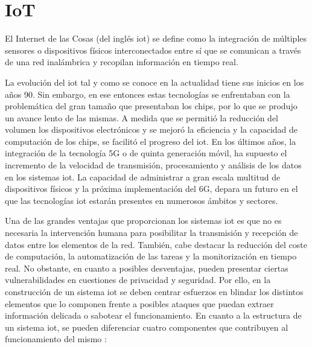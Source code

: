 \section{IoT}
\label{sec:iot}

El Internet de las Cosas (del inglés \gls{iot}) \cite{iot} \cite{iotamazon} se define como la integración de múltiples sensores o dispositivos físicos interconectados entre sí que se comunican a través de una red inalámbrica y recopilan información en tiempo real. 

\vspace{3mm}

La evolución del \gls{iot} tal y como se conoce en la actualidad tiene sus inicios en los años 90. Sin embargo, en ese entonces estas tecnologías se enfrentaban con la problemática del gran tamaño que presentaban los chips, por lo que se produjo un avance lento de las mismas. A medida que se permitió la reducción del volumen los dispositivos electrónicos y se mejoró la eficiencia y la capacidad de computación de los chips, se facilitó el progreso del \gls{iot}. En los últimos años, la integración de la tecnología 5G o de quinta generación móvil, ha supuesto el incremento de la velocidad de transmisión, procesamiento y análisis de los datos en los sistemas \gls{iot}. La capacidad de administrar a gran escala multitud de dispositivos físicos y la próxima implementación del 6G, depara un futuro en el que las tecnologías \gls{iot} estarán presentes en numerosos ámbitos y sectores.

\vspace{3mm}

Una de las grandes ventajas que proporcionan los sistemas \gls{iot} es que no es necesaria la intervención humana para posibilitar la transmisión y recepción de datos entre los elementos de la red. También, cabe destacar la reducción del coste de computación, la automatización de las tareas y la monitorización en tiempo real. No obstante, en cuanto a posibles desventajas, pueden presentar ciertas vulnerabilidades en cuestiones de privacidad y seguridad. Por ello, en la construcción de un sistema \gls{iot} se deben centrar esfuerzos en blindar los distintos elementos que lo componen frente a posibles ataques que puedan extraer información delicada o sabotear el funcionamiento. En cuanto a la estructura de un sistema \gls{iot}, se pueden diferenciar cuatro componentes que contribuyen al funcionamiento del mismo \cite{iot} \cite{iotamazon}:

